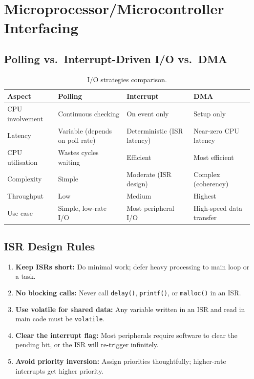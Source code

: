 \section{Microprocessor/Microcontroller Interfacing}
\label{sec:io:interfacing}

\subsection{Polling vs.\ Interrupt-Driven I/O vs.\ DMA}

\begin{table}[H]
\centering
\caption{I/O strategies comparison.}
\label{tab:io:strategies}
\begin{tabularx}{\textwidth}{l X X X}
\toprule
\textbf{Aspect} & \textbf{Polling} & \textbf{Interrupt} & \textbf{DMA} \\
\midrule
CPU involvement & Continuous checking & On event only & Setup only \\
Latency & Variable (depends on poll rate) & Deterministic (ISR latency) & Near-zero CPU latency \\
CPU utilisation & Wastes cycles waiting & Efficient & Most efficient \\
Complexity & Simple & Moderate (ISR design) & Complex (coherency) \\
Throughput & Low & Medium & Highest \\
Use case & Simple, low-rate I/O & Most peripheral I/O & High-speed data transfer \\
\bottomrule
\end{tabularx}
\end{table}

\subsection{ISR Design Rules}

\begin{important}
\begin{enumerate}[nosep]
  \item \textbf{Keep ISRs short:} Do minimal work; defer heavy processing to main loop or a task.
  \item \textbf{No blocking calls:} Never call \texttt{delay()}, \texttt{printf()}, or \texttt{malloc()} in an ISR.
  \item \textbf{Use volatile for shared data:} Any variable written in an ISR and read in main code must be \texttt{volatile}.
  \item \textbf{Clear the interrupt flag:} Most peripherals require software to clear the pending bit, or the ISR will re-trigger infinitely.
  \item \textbf{Avoid priority inversion:} Assign priorities thoughtfully; higher-rate interrupts get higher priority.
\end{enumerate}
\end{important}

